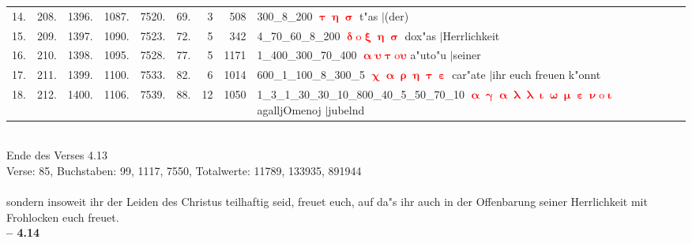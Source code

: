 \documentclass[a4paper,10pt,landscape]{article}
\begin{document}
\begin{tabular}{rrrrrrrrp{120mm}}
14.&208.&1396.&1087.&7520.&69.&3&508&300\_8\_200 \textcolor{red}{$\boldsymbol{\uptau\upeta\upsigma}$} t"as $|$(der)\\
15.&209.&1397.&1090.&7523.&72.&5&342&4\_70\_60\_8\_200 \textcolor{red}{$\boldsymbol{\updelta\mathrm{o}\upxi\upeta\upsigma}$} dox"as $|$Herrlichkeit\\
16.&210.&1398.&1095.&7528.&77.&5&1171&1\_400\_300\_70\_400 \textcolor{red}{$\boldsymbol{\upalpha\upsilon\uptau\mathrm{o}\upsilon}$} a"uto"u $|$seiner\\
17.&211.&1399.&1100.&7533.&82.&6&1014&600\_1\_100\_8\_300\_5 \textcolor{red}{$\boldsymbol{\upchi\upalpha\uprho\upeta\uptau\upepsilon}$} car"ate $|$ihr euch freuen k"onnt\\
18.&212.&1400.&1106.&7539.&88.&12&1050&1\_3\_1\_30\_30\_10\_800\_40\_5\_50\_70\_10 \textcolor{red}{$\boldsymbol{\upalpha\upgamma\upalpha\uplambda\uplambda\upiota\upomega\upmu\upepsilon\upnu\mathrm{o}\upiota}$} agalljOmenoj $|$jubelnd\\
\end{tabular}\medskip \\
Ende des Verses 4.13\\
Verse: 85, Buchstaben: 99, 1117, 7550, Totalwerte: 11789, 133935, 891944\\
\\
sondern insoweit ihr der Leiden des Christus teilhaftig seid, freuet euch, auf da"s ihr auch in der Offenbarung seiner Herrlichkeit mit Frohlocken euch freuet.\\
\newpage 
{\bf -- 4.14}\\
\medskip \\
\end{document}
